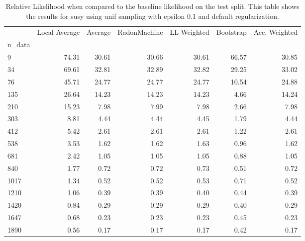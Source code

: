 \begin{table}
\centering
\caption{Relative Likelihood when compared to the baseline likelihood on the test split. This table shows the results for  susy using  unif sampling with epsilon  0.1 and  default regularization.}
\label{tab:4}
\begin{tabular}{lrrrrrr}
\toprule
{} &  Local Average &  Average &  RadonMachine &  LL-Weighted &  Bootstrap &  Acc. Weighted \\
n\_data &                &          &               &              &            &                \\
\midrule
9      &          74.31 &    30.61 &         30.66 &        30.61 &      66.57 &          30.85 \\
34     &          69.61 &    32.81 &         32.89 &        32.82 &      29.25 &          33.02 \\
76     &          45.71 &    24.77 &         24.77 &        24.77 &      10.54 &          24.88 \\
135    &          26.64 &    14.23 &         14.23 &        14.23 &       4.66 &          14.24 \\
210    &          15.23 &     7.98 &          7.99 &         7.98 &       2.66 &           7.98 \\
303    &           8.81 &     4.44 &          4.44 &         4.45 &       1.79 &           4.44 \\
412    &           5.42 &     2.61 &          2.61 &         2.61 &       1.22 &           2.61 \\
538    &           3.53 &     1.62 &          1.62 &         1.63 &       0.96 &           1.62 \\
681    &           2.42 &     1.05 &          1.05 &         1.05 &       0.88 &           1.05 \\
840    &           1.77 &     0.72 &          0.72 &         0.73 &       0.51 &           0.72 \\
1017   &           1.34 &     0.52 &          0.52 &         0.53 &       0.71 &           0.52 \\
1210   &           1.06 &     0.39 &          0.39 &         0.40 &       0.44 &           0.39 \\
1420   &           0.84 &     0.29 &          0.29 &         0.29 &       0.40 &           0.29 \\
1647   &           0.68 &     0.23 &          0.23 &         0.23 &       0.45 &           0.23 \\
1890   &           0.56 &     0.17 &          0.17 &         0.17 &       0.42 &           0.17 \\
\bottomrule
\end{tabular}
\end{table}
